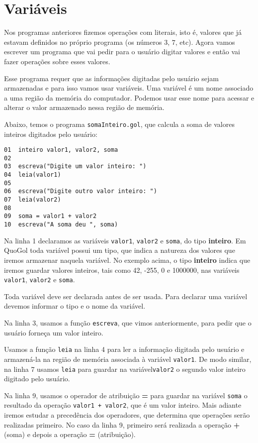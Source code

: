 \documentclass{report}
\newcommand{\Qgol}{QuoGol\;}
\begin{document}
\section{Variáveis}

Nos programas anteriores fizemos operações com literais, isto é,
valores que já estavam definidos no próprio programa (os números $3$, $7$, etc).
Agora vamos escrever um programa que vai pedir para o usuário
digitar valores e então vai fazer operações sobre esses valores.

Esse programa requer que as informações digitadas pelo usuário sejam
armazenadas e para isso vamos usar variáveis. Uma variável é um nome associado
a uma região da memória do computador. Podemos usar esse nome para
acessar e alterar o valor armazenado nessa região de memória. 

Abaixo, temos o programa \texttt{somaInteiro.gol}, que
calcula a soma de valores inteiros digitados pelo usuário:
%
\begin{verbatim}
01  inteiro valor1, valor2, soma
02
03  escreva("Digite um valor inteiro: ")
04  leia(valor1)
05
06  escreva("Digite outro valor inteiro: ")
07  leia(valor2)
08
09  soma = valor1 + valor2
10  escreva("A soma deu ", soma)
\end{verbatim}
%
Na linha 1 declaramos as variáveis \texttt{valor1}, \texttt{valor2}
e \texttt{soma}, do tipo \textbf{inteiro}. Em \Qgol
toda variável possui um tipo, que indica a natureza dos valores que
iremos armazenar naquela variável. No exemplo acima, o tipo \textbf{inteiro} indica
que iremos guardar valores inteiros, tais como 42, -255, 0 e 1000000,
nas variáveis \texttt{valor1}, \texttt{valor2} e \texttt{soma}.

Toda variável deve ser declarada antes de ser usada. Para declarar
uma variável devemos informar o tipo e o nome da variável.
 
Na linha 3, usamos a função \texttt{escreva}, que vimos anteriormente,
para pedir que o usuário forneça um valor inteiro.

Usamos a função \texttt{leia} na linha 4 para ler a informação digitada
pelo usuário e armazená-la na região de memória associada à variável
\texttt{valor1}. De modo similar, na linha 7 usamos \texttt{leia}
para guardar na variável\texttt{valor2} o segundo valor inteiro
digitado pelo usuário.

Na linha 9, usamos o operador de atribuição \textbf{=} para guardar
na variável \texttt{soma} o resultado da operação \texttt{valor1 + valor2},
que é um valor inteiro. Mais adiante iremos estudar a precedência dos
operadores, que determina que operações serão realizadas primeiro.
No caso da linha 9, primeiro será realizada a operação \textbf{+} (soma)
e depois a operação \textbf{=} (atribuição).
\end{document}
